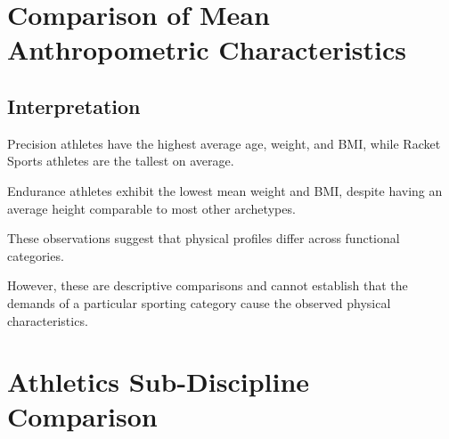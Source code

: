 \documentclass[11pt,a4paper]{article}
\begin{document}
\section{Comparison of Mean Anthropometric Characteristics}

\begin{table}[H]
\centering
\small
\caption{Mean Anthropometric Characteristics by Archetype}
\end{table}

\subsection*{Interpretation}

Precision athletes have the highest average age,
weight, and BMI, while Racket Sports athletes are
the tallest on average.

Endurance athletes exhibit the lowest mean weight
and BMI, despite having an average height
comparable to most other archetypes.

These observations suggest that physical profiles
differ across functional categories.

However, these are descriptive comparisons and
cannot establish that the demands of a particular
sporting category cause the observed physical
characteristics.


\section{Athletics Sub-Discipline Comparison}\label{sec:athletics}
\end{document}
